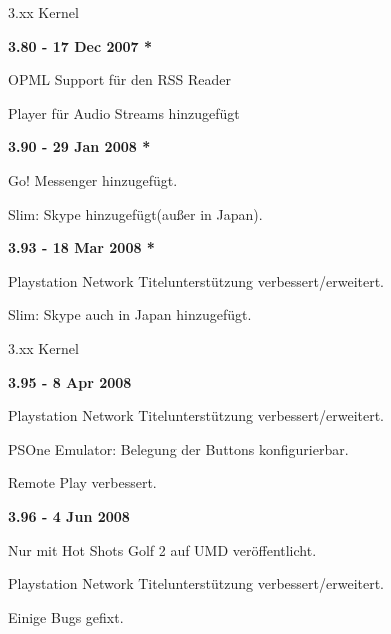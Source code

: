 \documentclass[mode=print,paper=screen,size=10pt,style=paintings]{powerdot}
\begin{document}
\begin{slide}{3.xx Kernel}
	\begin{large}\textbf{3.80 - 17 Dec 2007 *}\end{large}
	\begin{list}{-}{}
		\item{OPML Support für den RSS Reader}
		\item{Player für Audio Streams hinzugefügt}
	\end{list}
	\begin{large}\textbf{3.90 - 29 Jan 2008 *}\end{large}
	\begin{list}{-}{}
		\item{Go! Messenger hinzugefügt.}
		\item{Slim: Skype hinzugefügt(außer in Japan).}
	\end{list}
	\begin{large}\textbf{3.93 - 18 Mar 2008 *}\end{large}
	\begin{list}{-}{}
		\item{Playstation Network Titelunterstützung verbessert/erweitert.}
		\item{Slim: Skype auch in Japan hinzugefügt.}
	\end{list}
\end{slide}

\begin{slide}{3.xx Kernel}
	\begin{large}\textbf{3.95 - 8 Apr 2008}\end{large}
	\begin{list}{-}{}
		\item{Playstation Network Titelunterstützung verbessert/erweitert.}
		\item{PSOne Emulator: Belegung der Buttons konfigurierbar.}
		\item{Remote Play verbessert.}
	\end{list}
	\begin{large}\textbf{3.96 - 4 Jun 2008}\end{large}
	\begin{list}{-}{}
		\item{Nur mit Hot Shots Golf 2 auf UMD veröffentlicht.}
		\item{Playstation Network Titelunterstützung verbessert/erweitert.}
		\item{Einige Bugs gefixt.}
	\end{list}
\end{slide}
\end{document}
